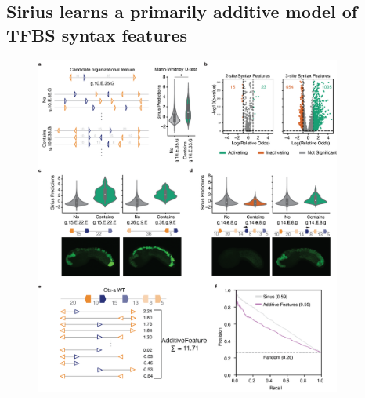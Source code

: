 \subsection{Sirius learns a primarily additive model of TFBS syntax features}

\begin{figure}[p]
    \centering
    \includegraphics[width=0.9\textwidth, height=0.745\textheight]{2_figures-and-files/Fig3.png}

\end{figure}

